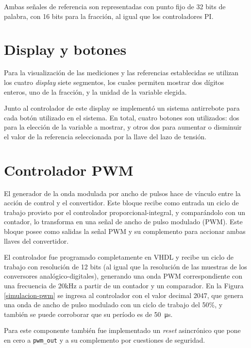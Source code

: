 Ambas señales de referencia son representadas con punto fijo de 32 bits de palabra, con 16 bits para la fracción, al igual que los controladores PI.

\section{Display y botones}

Para la visualización de las mediciones y las referencias establecidas se utilizan los cuatro \emph{display} siete segmentos, los cuales permiten mostrar dos dígitos enteros, uno de la fracción, y la unidad de la variable elegida.

Junto al controlador de este display se implementó un sistema antirrebote para cada botón utilizado en el sistema. En total, cuatro botones son utilizados: dos para la elección de la variable a mostrar, y otros dos para aumentar o disminuir el valor de la referencia seleccionada por la llave del lazo de tensión. 

\section{Controlador PWM}

El generador de la onda modulada por ancho de pulsos hace de vínculo entre la acción de control y el convertidor. Este bloque recibe como entrada un ciclo de trabajo provisto por el controlador proporcional-integral, y comparándolo con un contador, lo transforma en una señal de ancho de pulso modulado (PWM). Este bloque posee como salidas la señal PWM y su complemento para accionar ambas llaves del convertidor.

El controlador fue programado completamente en VHDL y recibe un ciclo de trabajo con resolución de 12 bits (al igual que la resolución de las muestras de los conversores analógico-digitales), generando una onda PWM correspondiente con una frecuencia de 20kHz a partir de un contador y un comparador. En la Figura \ref{simulacion-pwm} se ingresa al controlador con el valor decimal 2047, que genera una onda de ancho de pulso modulado con un ciclo de trabajo del 50\%, y también se puede corroborar que su período es de \SI{50}{\micro\second}.

Para este componente también fue implementado un \emph{reset} asincrónico que pone en cero a \texttt{pwm\_out} y a su complemento por cuestiones de seguridad.

